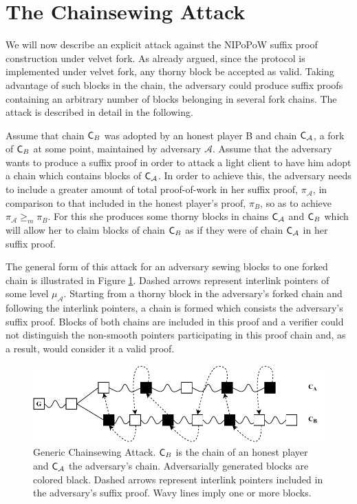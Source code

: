 \section{The Chainsewing Attack}
We  will now describe an explicit attack against the NIPoPoW suffix proof construction under velvet fork. As already argued, since the protocol is implemented under velvet fork, any thorny block be accepted as valid. Taking advantage of such blocks in the chain, the adversary could produce suffix proofs containing an arbitrary number of blocks belonging in several fork chains. The attack is described in detail in the following.

Assume that chain $\mathsf{C}_B$ was adopted by an honest player B and chain $\mathsf{C}_\mathcal{A}$, a fork of $\mathsf{C}_B$ at some point, maintained by adversary $\mathcal{A}$. Assume that the adversary wants to produce a suffix  proof in order to attack a light client to have him adopt a chain which contains blocks of $\mathsf{C}_\mathcal{A}$. In order to achieve this, the adversary needs to include a greater amount of total proof-of-work in her suffix proof, $\pi_\mathcal{A}$, in comparison to that included in the honest player's proof, $\pi_B$, so as to achieve $\pi_\mathcal{A} \geq_m \pi_B$. For this she produces some thorny blocks in chains $\mathsf{C}_\mathcal{A}$ and $\mathsf{C}_B$ which will allow her to claim blocks of chain $\mathsf{C}_B$ as if they were of chain $\mathsf{C}_\mathcal{A}$ in her suffix proof.

The general form of this attack for an adversary sewing blocks to one forked chain is illustrated in Figure \ref{fig:generic_attack}. Dashed arrows represent interlink pointers of some level $\mu_\mathcal{A}$. Starting from a thorny block in the adversary's forked chain and following the interlink pointers, a chain is formed which consists the adversary's suffix proof. Blocks of both chains are included in this proof and a verifier could not distinguish the non-smooth pointers participating in this proof chain and, as a result, would consider it a valid proof.

\begin{figure}[h]
	\begin{center}
		\includegraphics[width=0.95\columnwidth
		]{figures/generic_chainsewing_attack.pdf}
	\end{center}
	\caption{Generic Chainsewing Attack. $\mathsf{C}_B$ is the chain of an honest 	player and $\mathsf{C}_\mathcal{A}$ the adversary's chain. Adversarially generated blocks are 	colored black. Dashed arrows represent interlink pointers included in the 	adversary's suffix proof. Wavy lines imply one or more blocks.}
	\label{fig:generic_attack}
\end{figure}

